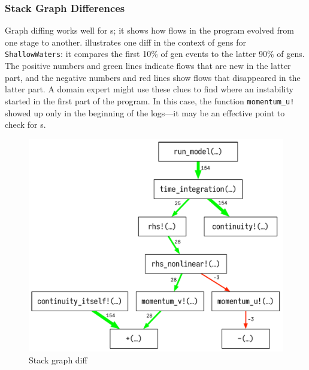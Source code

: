 \documentclass{juliacon}
\begin{document}


\subsubsection{Stack Graph Differences}

Graph diffing works well for \CSTG{}s; it shows how flows in the program evolved
from one stage to another.
 illustrates one diff in the context of \NaN{} gens for
\texttt{ShallowWaters}:
it compares the first 10\% of gen events to the latter 90\% of gens.
The positive numbers and green lines indicate flows that are new in the latter part,
and the negative numbers and red lines show flows that disappeared in the latter part.
A domain expert might use these clues to find where an instability started in
the first part of the program.
In this case, the function \texttt{momentum\_u!} showed up only in the
beginning of the logs---it may be an effective point to check for \Nan{}s.

\begin{figure}[t]
  \centering
  \includegraphics[width=0.96\columnwidth]{./fig/cstg_diff_pretty.pdf}
  \caption{Stack graph diff}
  \label{fig:cstg_diff_demo}
\end{figure}
\end{document}
